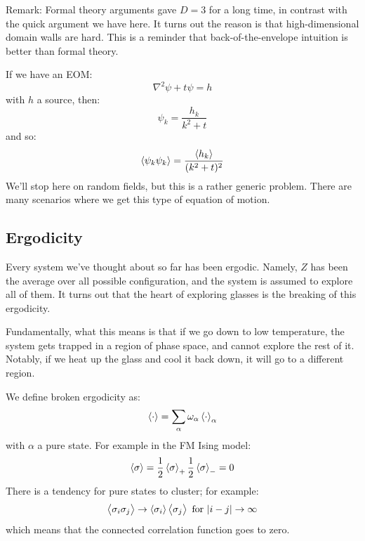 Remark: Formal theory arguments gave $D = 3$ for a long time, in contrast with the quick argument we have here. It turns out the reason is that high-dimensional domain walls are hard. This is a reminder that back-of-the-envelope intuition is better than formal theory.

If we have an EOM:
\begin{equation}
    \nabla^2 \psi + t\psi = h
\end{equation}
with $h$ a source, then:
\begin{equation}
    \psi_k = \frac{h_k}{k^2 + t}
\end{equation}
and so:
\begin{equation}
    \left< \psi_k\psi_{k} \right> = \frac{\left< h_k \right>}{(k^2 + t)^2}
\end{equation}
We'll stop here on random fields, but this is a rather generic problem. There are many scenarios where we get this type of equation of motion.

\subsection{Ergodicity}
Every system we've thought about so far has been ergodic. Namely, $Z$ has been the average over all possible configuration, and the system is assumed to explore all of them. It turns out that the heart of exploring glasses is the breaking of this ergodicity.

Fundamentally, what this means is that if we go down to low temperature, the system gets trapped in a region of phase space, and cannot explore the rest of it. Notably, if we heat up the glass and cool it back down, it will go to a different region.

We define broken ergodicity as:
\begin{equation}
    \left< \cdot \right> = \sum_\alpha \omega_\alpha \left< \cdot \right>_\alpha
\end{equation}
with $\alpha$ a pure state.
For example in the FM Ising model:
\begin{equation}
    \left< \sigma \right> = \frac{1}{2}\left< \sigma \right>_+\frac{1}{2}\left< \sigma \right>_- = 0
\end{equation}
There is a tendency for pure states to cluster; for example:
\begin{equation}
    \left< \sigma_i\sigma_j \right> \to \left< \sigma_i \right>\left< \sigma_j \right> \text{ for } \lvert i - j \rvert \to \infty
\end{equation}
which means that the connected correlation function goes to zero.

